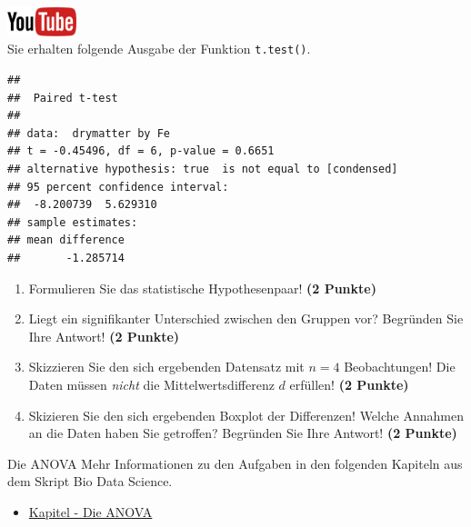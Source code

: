 \documentclass[a4paper, 9pt]{scrartcl}\usepackage[]{graphicx}\usepackage[]{xcolor}
\makeatletter
\newenvironment{kframe}{%
 \def\at@end@of@kframe{}%
 \ifinner\ifhmode%
  \def\at@end@of@kframe{\end{minipage}}%
  \begin{minipage}{\columnwidth}%
 \fi\fi%
 \def\FrameCommand##1{\hskip\@totalleftmargin \hskip-\fboxsep
 \colorbox{shadecolor}{##1}\hskip-\fboxsep
     \hskip-\linewidth \hskip-\@totalleftmargin \hskip\columnwidth}%
 \MakeFramed {\advance\hsize-\width
   \@totalleftmargin\z@ \linewidth\hsize
   \@setminipage}}%
 {\par\unskip\endMakeFramed%
 \at@end@of@kframe}
\newenvironment{knitrout}{}{} %
\makeatother
\begin{document}
\hfill\href{https://youtu.be/kHmfEmU6lrk}{\includegraphics[width =
  2cm]{img/youtube}}\\[1Ex]


Sie erhalten folgende \Rlogo Ausgabe der Funktion \texttt{t.test()}.

\begin{knitrout}
\color{fgcolor}\begin{kframe}
\begin{verbatim}
## 
## 	Paired t-test
## 
## data:  drymatter by Fe
## t = -0.45496, df = 6, p-value = 0.6651
## alternative hypothesis: true  is not equal to [condensed]
## 95 percent confidence interval:
##  -8.200739  5.629310
## sample estimates:
## mean difference 
##       -1.285714
\end{verbatim}
\end{kframe}
\end{knitrout}


\begin{enumerate}
  \item Formulieren Sie das statistische Hypothesenpaar! \textbf{(2
Punkte)}
\item Liegt ein signifikanter Unterschied zwischen den Gruppen vor?
  Begr{\"u}nden Sie Ihre Antwort! \textbf{(2 Punkte)}
\item Skizzieren Sie den sich ergebenden Datensatz mit $n = 4$
  Beobachtungen! Die Daten m{\"u}ssen \textit{nicht} die Mittelwertsdifferenz
  $d$ erf{\"u}llen! \textbf{(2 Punkte)} 
\item Skizieren Sie den sich ergebenden Boxplot der Differenzen! Welche Annahmen an die Daten haben Sie getroffen? Begr{\"u}nden Sie Ihre Antwort! \textbf{(2 Punkte)} 
\end{enumerate}
 
\clearpage
\begin{graybox}{Die ANOVA}
Mehr Informationen zu den Aufgaben in den folgenden Kapiteln aus dem Skript Bio Data Science.
  \begin{itemize}
  \item \href{https://jkruppa.github.io/stat-tests-anova.html}{Kapitel - Die ANOVA}
  \end{itemize}
\end{graybox}
\clearpage
\end{document}
